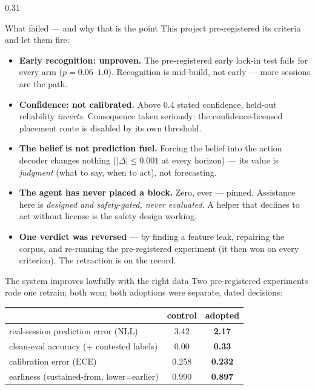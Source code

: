 \documentclass[final]{beamer}
\begin{document}
\begin{frame}[t]
\begin{columns}[t]
\begin{column}{0.31\textwidth}
\begin{alertblock}{What failed --- and why that is the point}
This project pre-registered its criteria and let them fire:
\begin{itemize}
  \item \textbf{Early recognition: unproven.} The pre-registered early
    lock-in test fails for every arm ($p = 0.06$--$1.0$). Recognition is
    mid-build, not early --- more sessions are the path.
  \item \textbf{Confidence: not calibrated.} Above 0.4 stated confidence,
    held-out reliability \emph{inverts}. Consequence taken seriously: the
    confidence-licensed placement route is disabled by its own threshold.
  \item \textbf{The belief is not prediction fuel.} Forcing the belief into
    the action decoder changes nothing ($|\Delta| \le 0.001$ at every
    horizon) --- its value is \emph{judgment} (what to say, when to act),
    not forecasting.
  \item \textbf{The agent has never placed a block.} Zero, ever ---
    pinned. Assistance here is \emph{designed and safety-gated, never
    evaluated}. A helper that declines to act without license is the
    safety design working.
  \item \textbf{One verdict was reversed} --- by finding a feature leak,
    repairing the corpus, and re-running the pre-registered experiment
    (it then won on every criterion). The retraction is on the record.
\end{itemize}
\end{alertblock}

\begin{block}{The system improves lawfully with the right data}
Two pre-registered experiments rode one retrain; both won; both adoptions
were separate, dated decisions:
\begin{center}
\begin{tabular}{lcc}
\toprule
 & control & adopted \\
\midrule
real-session prediction error (NLL) & 3.42 & \textbf{2.17} \\
clean-eval accuracy (+ contested labels) & 0.00 & \textbf{0.33} \\
calibration error (ECE) & 0.258 & \textbf{0.232} \\
earliness (sustained-from, lower=earlier) & 0.990 & \textbf{0.897} \\
\bottomrule
\end{tabular}
\end{center}
\end{block}


\end{column}
\end{columns}
\end{frame}
\end{document}
